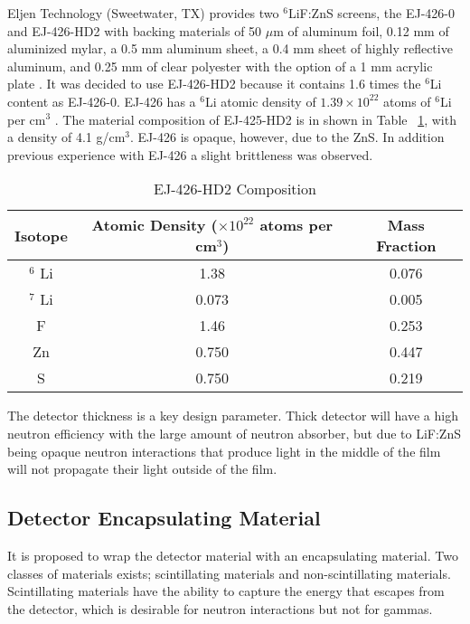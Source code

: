 Eljen Technology (Sweetwater, TX) provides two ${}^6$LiF:ZnS screens, the EJ-426-0 and EJ-426-HD2 with backing materials   of 50 $\mu$m of aluminum foil, 0.12 mm of aluminized mylar, a 0.5 mm aluminum sheet, a 0.4 mm sheet of highly reflective aluminum, and 0.25 mm of clear polyester with the option of a 1 mm acrylic plate \cite{eljen_ej-426_2012}.
It was decided to use EJ-426-HD2 because it contains 1.6 times the ${}^{6}$Li content as EJ-426-0. EJ-426 has a ${}^{6}$Li atomic density of $1.39\times10^{22}$ atoms of ${}^6$Li per cm${}^3$ \cite{eljen_ej-426_2012}. 
The material composition of EJ-425-HD2 is in shown in Table ~\ref{tab:EJ426Composition}, with a density of 4.1 g/cm${}^3$\cite{carel_w.e_inorganic-scintillator_2001}.
EJ-426 is opaque, however, due to the ZnS.  In addition previous experience with EJ-426 a slight brittleness was observed.
\begin{table}
    \centering
    \caption[Caption for LOF]{EJ-426-HD2 Composition\protect\footnotemark \cite{urffer_ej_2012} }
    \begin{tabular}{c|c c}
        Isotope & Atomic Density ($\times 10^{22}$ atoms per cm${}^3$) & Mass Fraction\\
        \hline
        $ {}^6 $ Li & 1.38 & 0.076\\
        $ {}^7 $ Li & 0.073 & 0.005\\
        F & 1.46 & 0.253\\
        Zn & 0.750 & 0.447\\
        S & 0.750 & 0.219\\
    \end{tabular}
    \label{tab:EJ426Composition}
\end{table}
The detector thickness is a key design parameter. 
Thick detector will have a high neutron efficiency with the large amount of neutron absorber, but due to LiF:ZnS being opaque neutron interactions that produce light in the middle of the film will not propagate their light outside of the film.

\subsection{Detector Encapsulating Material}
It is proposed to wrap the detector material with an encapsulating material.
Two classes of materials exists; scintillating materials and non-scintillating materials.  
Scintillating materials have the ability to capture the energy that escapes from the detector, which is desirable for neutron interactions but not for gammas.

